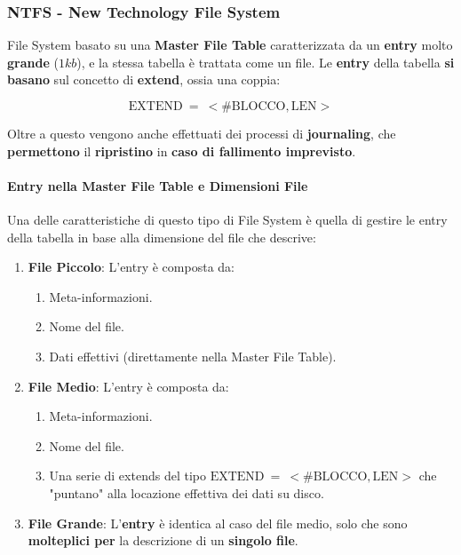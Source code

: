 \documentclass{article}
\begin{document}
\subsubsection{NTFS - New Technology File System}

File System basato su una \textbf{Master File Table} caratterizzata da un \textbf{entry} molto \textbf{grande} ($1kb$), e la stessa tabella è trattata come un file. Le \textbf{entry} della tabella \textbf{si basano} sul concetto di \textbf{extend}, ossia una coppia:

\[ \text{EXTEND} \: = \: < \#\text{BLOCCO}, \text{LEN} > \]

Oltre a questo vengono anche effettuati dei processi di \textbf{journaling}, che \textbf{permettono} il \textbf{ripristino} in \textbf{caso di fallimento imprevisto}.

\paragraph{Entry nella Master File Table e Dimensioni File}

Una delle caratteristiche di questo tipo di File System è quella di gestire le entry della tabella in base alla dimensione del file che descrive:

\begin{enumerate}
    \item \textbf{File Piccolo}: L'entry è composta da:
    \begin{enumerate}
        \item Meta-informazioni.
        \item Nome del file.
        \item Dati effettivi (direttamente nella Master File Table).
    \end{enumerate}
    \item \textbf{File Medio}: L'entry è composta da:
    \begin{enumerate}
        \item Meta-informazioni.
        \item Nome del file.
        \item Una serie di extends del tipo $\text{EXTEND} \: = \: < \#\text{BLOCCO}, \text{LEN} >$ che "puntano" alla locazione effettiva dei dati su disco.
    \end{enumerate}
    \item \textbf{File Grande}: L'\textbf{entry} è identica al caso del file medio, solo che sono \textbf{molteplici per} la descrizione di un \textbf{singolo file}.
\end{enumerate}
\end{document}
